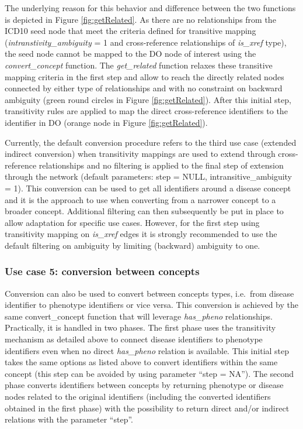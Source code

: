 \documentclass[9pt,a4paper,]{extarticle}
\begin{document}
The underlying reason for this behavior and difference between the two functions is depicted in Figure \ref{fig:getRelated}. As there are no relationships from the ICD10 seed node that meet the criteria defined for transitive mapping (\emph{intranstivity\_ambiguity} = 1 and cross-reference relationships of \emph{is\_xref} type), the seed node cannot be mapped to the DO node of interest using the \emph{convert\_concept} function. The \emph{get\_related} function relaxes these transitive mapping criteria in the first step and allow to reach the directly related nodes connected by either type of relationships and with no constraint on backward ambiguity (green round circles in Figure \ref{fig:getRelated}). After this initial step, transitivity rules are applied to map the direct cross-reference identifiers to the identifier in DO (orange node in Figure \ref{fig:getRelated}).

Currently, the default conversion procedure refers to the third use case (extended indirect conversion) when transitivity mappings are used to extend through cross-reference relationships and no filtering is applied to the final step of extension through the network (default parameters: step = NULL, intransitive\_ambiguity = 1). This conversion can be used to get all identifiers around a disease concept and it is the approach to use when converting from a narrower concept to a broader concept. Additional filtering can then subsequently be put in place to allow adaptation for specific use cases. However, for the first step using transitivity mapping on \emph{is\_xref} edges it is strongly recommended to use the default filtering on ambiguity by limiting (backward) ambiguity to one.

\hypertarget{use-case-5-conversion-between-concepts}{%
\subsubsection{Use case 5: conversion between concepts}\label{use-case-5-conversion-between-concepts}}

Conversion can also be used to convert between concepts types, i.e.~from disease identifier to phenotype identifiers or vice versa. This conversion is achieved by the same convert\_concept function that will leverage \emph{has\_pheno} relationships. Practically, it is handled in two phases. The first phase uses the transitivity mechanism as detailed above to connect disease identifiers to phenotype identifiers even when no direct \emph{has\_pheno} relation is available. This initial step takes the same options as listed above to convert identifiers within the same concept (this step can be avoided by using parameter ``step = NA''). The second phase converts identifiers between concepts by returning phenotype or disease nodes related to the original identifiers (including the converted identifiers obtained in the first phase) with the possibility to return direct and/or indirect relations with the parameter ``step''.
\end{document}
